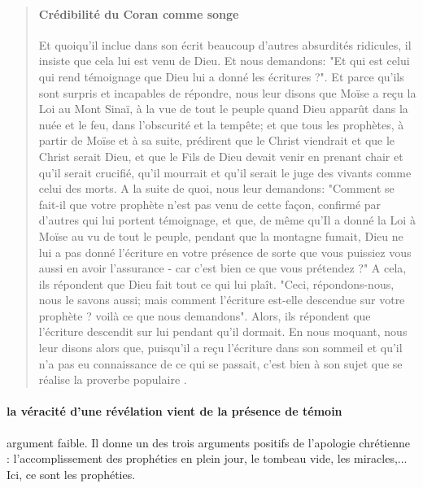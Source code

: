 \begin{quote}
\paragraph{Crédibilité du Coran comme songe}
Et quoiqu'il inclue dans son écrit beaucoup d'autres absurdités ridicules, il insiste que cela lui est venu de Dieu. Et nous demandons: "Et qui est celui qui rend témoignage que Dieu lui a donné les écritures ?". Et parce qu'ils sont surpris et incapables de répondre, nous leur disons que Moïse a reçu la Loi au Mont Sinaï, à la vue de tout le peuple quand Dieu apparût dans la nuée et le feu, dans l'obscurité et la tempête; et que tous les prophètes, à partir de Moïse et à sa suite, prédirent que le Christ viendrait et que le Christ serait Dieu, et que le Fils de Dieu devait venir en prenant chair et qu'il serait crucifié, qu'il mourrait et qu'il serait le juge des vivants comme celui des morts. A la suite de quoi, nous leur demandons: "Comment se fait-il que votre prophète n'est pas venu de cette façon, confirmé par d'autres qui lui portent témoignage, et que, de même qu'Il a donné la Loi à Moïse au vu de tout le peuple, pendant que la montagne fumait, Dieu ne lui a pas donné l'écriture en votre présence de sorte que vous puissiez vous aussi en avoir l'assurance - car c'est bien ce que vous prétendez ?" A cela, ils répondent que Dieu fait tout ce qui lui plaît. "Ceci, répondons-nous, nous le savons aussi; mais comment l'écriture est-elle descendue sur votre prophète ? voilà ce que nous demandons". Alors, ils répondent que l'écriture descendit sur lui pendant qu'il dormait. En nous moquant, nous leur disons alors que, puisqu'il a reçu l'écriture dans son sommeil et qu'il n'a pas eu connaissance de ce qui se passait, c'est bien à son sujet que se réalise la proverbe populaire .
\end{quote}

\paragraph{la véracité d'une révélation vient de la présence de témoin} argument faible. Il donne un des trois arguments positifs de l'apologie chrétienne : l'accomplissement des prophéties en plein jour, le tombeau vide, les miracles,... Ici, ce sont les prophéties. 

